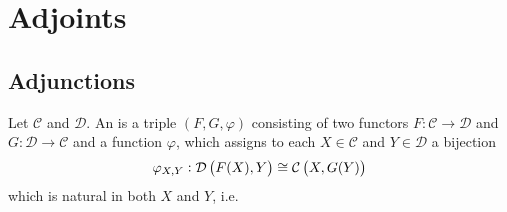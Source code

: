 \section{Adjoints}
\subsection{Adjunctions}

\begin{definition}
	Let $\mathcal{C}$ and $\mathcal{D}$. An  is a triple $(F,G,\varphi)$ consisting of two functors $F : \mathcal{C} \to \mathcal{D}$ and $G : \mathcal{D} \to \mathcal{C}$ and a function $\varphi$, which assigns to each $X \in \mathcal{C}$ and $Y \in \mathcal{D}$ a bijection
	\begin{equation}
		\varphi_{X,Y} : \mathcal{D}\del[1]{F(X),Y} \cong \mathcal{C}\del[1]{X,G(Y)}
	\end{equation}
	\noindent which is natural in both $X$ and $Y$, i.e. 
\end{definition}
